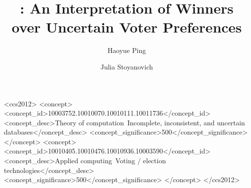 \documentclass[acmsmall]{acmart}
\begin{document}
  
\title{\mEw: An Interpretation of Winners over Uncertain Voter Preferences}

\author{Haoyue Ping}

\author{Julia Stoyanovich}




\begin{CCSXML}
<ccs2012>
   <concept>
       <concept_id>10003752.10010070.10010111.10011736</concept_id>
       <concept_desc>Theory of computation~Incomplete, inconsistent, and uncertain databases</concept_desc>
       <concept_significance>500</concept_significance>
       </concept>
   <concept>
       <concept_id>10010405.10010476.10010936.10003590</concept_id>
       <concept_desc>Applied computing~Voting / election technologies</concept_desc>
       <concept_significance>500</concept_significance>
       </concept>
 </ccs2012>
\end{CCSXML}


\end{document}
